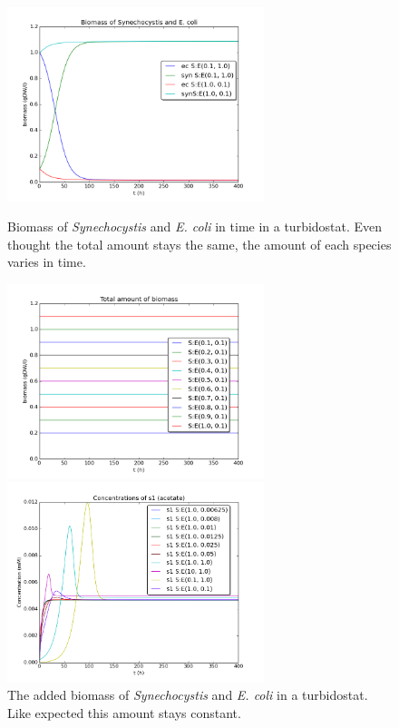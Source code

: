 \documentclass[12pt]{report}
\begin{document}
\begin{figure}[htbp]
  \hfill
  \begin{minipage}[t]{.45\textwidth}
 \begin{center}  
     \includegraphics[width=7.5cm]{sub_dependent_turb_biomassex.png}
     \caption{Biomass of \textit{Synechocystis} and \textit{E. coli} in time in a turbidostat. Even thought the total amount stays the same, the amount of each species varies in time.}
    \label{fig:subturbbex}
    \end{center}
  \end{minipage}
  \hfill
  \begin{minipage}[t]{.45\textwidth}
    \begin{center}  
     \includegraphics[width=7.5cm]{total_biomass1.png}
     \caption{The added biomass of \textit{Synechocystis} and \textit{E. coli} in a turbidostat. Like expected this amount stays constant.}
    \label{fig:subturbtb}
    \end{center}
  \end{minipage}
  \hfill
  \begin{minipage}{.45\textwidth}
   \begin{center}
         \includegraphics[width=7.5cm]{S1.png}

\end{center}
\end{minipage}
\end{figure}
\end{document}
